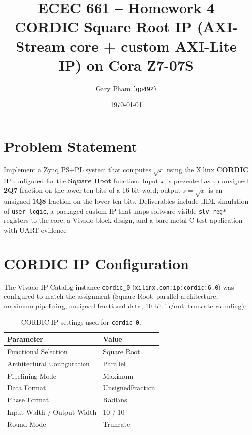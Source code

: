 \documentclass[11pt,letterpaper]{article}
\title{\vspace{-0.6in}\textbf{ECEC 661 -- Homework 4}\\
       \large CORDIC Square Root IP (AXI-Stream core + custom AXI-Lite IP) on Cora Z7-07S}
\author{Gary Pham \texttt{(gp492)}}
\date{\today}
\begin{document}
\maketitle
\vspace{-0.25in}

\section{Problem Statement}

Implement a Zynq PS+PL system that computes \(\sqrt{x}\) using the Xilinx
\textbf{CORDIC} IP configured for the \textbf{Square Root} function. Input
\(x\) is presented as an unsigned \textbf{2Q7} fraction on the lower ten bits
of a 16-bit word; output \(z=\sqrt{x}\) is an unsigned \textbf{1Q8} fraction on
the lower ten bits. Deliverables include HDL simulation of \texttt{user\_logic},
a packaged custom IP that maps software-visible \texttt{slv\_reg*} registers to
the core, a Vivado block design, and a bare-metal C test application with UART
evidence.

\section{CORDIC IP Configuration}

The Vivado IP Catalog instance \texttt{cordic\_0} (\texttt{xilinx.com:ip:cordic:6.0})
was configured to match the assignment (Square Root, parallel architecture,
maximum pipelining, unsigned fractional data, 10-bit in/out, truncate rounding):

\begin{table}[H]
    \centering
    \caption{CORDIC IP settings used for \texttt{cordic\_0}.}
    \label{tab:cordic_cfg}
    \small
    \begin{tabular}{ll}
        \toprule
        \textbf{Parameter} & \textbf{Value} \\
        \midrule
        Functional Selection & Square Root \\
        Architectural Configuration & Parallel \\
        Pipelining Mode & Maximum \\
        Data Format & UnsignedFraction \\
        Phase Format & Radians \\
        Input Width / Output Width & 10 / 10 \\
        Round Mode & Truncate \\
        \bottomrule
    \end{tabular}
\end{table}
\end{document}
